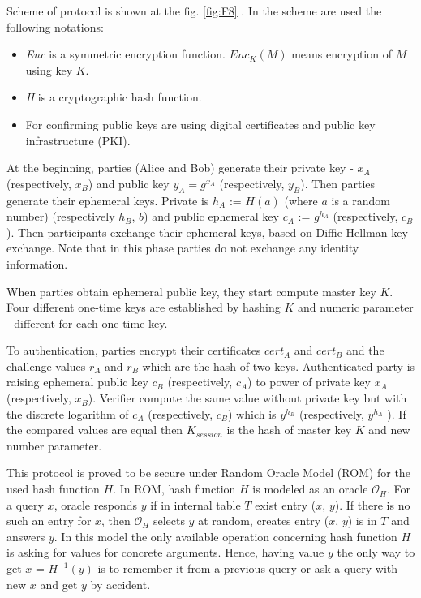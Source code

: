 \documentclass[11pt,titlepage]{article}
\theoremstyle{plain}
\begin{document}
Scheme of protocol is shown at the fig. \ref{fig:F8} \cite{AMA}. In the scheme are used the following notations:
\begin{itemize}
\item \textit{Enc} is a symmetric encryption function. \textit{$Enc_K(M)$} means encryption of $M$ using key $K$. 
\item \textit{H} is a cryptographic hash function. 
\item For confirming public keys are using digital certificates and public key infrastructure (PKI).
\end{itemize}


At the beginning, parties (Alice and Bob) generate their private key - $x_A$ (respectively, $x_B$) and public key $y_A = g^{x_A}$ (respectively, $y_B$). Then parties generate their ephemeral keys. Private is $h_A$ := $H(a)$ (where $a$ is a random number) (respectively $h_B$, $b$) and public ephemeral key $c_A$ := $g^{h_A}$ (respectively, $c_B$). Then participants exchange their ephemeral keys, based on Diffie-Hellman key exchange. Note that in this phase parties do not exchange any identity information.

\vspace{5mm}

When parties obtain ephemeral public key, they start compute master
key $K$. Four different one-time keys are established by hashing $K$ and numeric parameter - different for each one-time key.

\vspace{5mm}

To authentication, parties encrypt their certificates $cert_A$ and $cert_B$ and the challenge values $r_A$ and $r_B$ which are the hash of two keys. Authenticated party is raising ephemeral public key $c_B$ (respectively, $c_A$) to power of private key $x_A$ (respectively, $x_B$). Verifier compute the same value without private key but with the discrete logarithm of $c_A$ (respectively, $c_B$) which is $y^{h_B}$ (respectively, $y^{h_A}$ ). If the compared values are equal then $K_{session}$ is the hash of master key $K$ and new number parameter.

\vspace{5mm}

This protocol is proved to be secure under Random Oracle Model (ROM) for the used
hash function $H$. In ROM, hash function $H$ is modeled as an oracle $\mathcal{O}_H$. For a query $x$, oracle responds $y$ if in internal table $T$ exist entry ($x$, $y$). If there is no such an entry for $x$, then $\mathcal{O}_H$ selects $y$ at random, creates entry ($x$, $y$) is in $T$ and answers $y$. In this model the only available operation concerning hash function $H$ is asking for values for concrete arguments. Hence, having value $y$ the only way to get $x$ = $H^{-1}(y)$ is to remember it from a previous query or ask a query with new $x$ and get $y$ by accident. 
\end{document}
